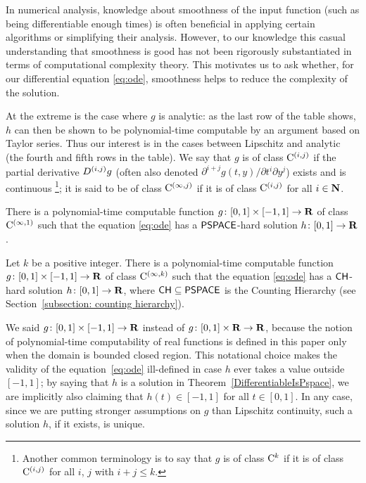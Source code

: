 In numerical analysis, 
knowledge about smoothness of the input function 
(such as being differentiable enough times) 
is often beneficial 
in applying certain algorithms or simplifying their analysis.
However, to our knowledge
this casual understanding that smoothness is good 
has not been 
rigorously substantiated in terms of 
computational complexity theory. 
This motivates us to ask whether, 
for our differential equation \eqref{eq:ode}, 
smoothness helps to reduce the complexity of the solution. 

At the extreme is the case where $g$ is analytic: 
as the last row of the table shows, 
$h$ can then be shown to be polynomial-time computable 
by an argument based on Taylor series. 
Thus our interest is in 
the cases between Lipschitz and analytic 
(the fourth and fifth rows in the table). 
We say that $g$ is of class $\mathrm C ^{(i, j)}$
if the partial derivative $D ^{(i, j)} g$ 
(often also denoted $\partial ^{i + j} g (t, y) / \partial t ^i \partial y ^j$)
exists and is continuous%
\footnote{%
Another common terminology is to say that $g$ is of class $\mathrm C ^k$
if it is of class $\mathrm C ^{(i,j)}$ 
for all $i$, $j$ with $i + j \leq k$.}; 
it is said to be of class $\mathrm C ^{(\infty, j)}$ if
it is of class $\mathrm C ^{(i, j)}$ for all $i \in \mathbf N$. 

\begin{theorem}
 \label{DifferentiableIsPspace}
There is a polynomial-time computable function
$g \colon [0,1] \times [-1,1] \to \mathbf R$ 
of class $\mathrm C ^{(\infty, 1)}$ such that
the equation \eqref{eq:ode} has a 
$\mathsf{PSPACE}$-hard solution $h \colon [0, 1] \to \mathbf R$. 
 \end{theorem}

 \begin{theorem}
  \label{KTimesIsCH}
Let $k$ be a positive integer. 
There is a polynomial-time computable function
$g \colon [0,1] \times [-1,1] \to \mathbf R$ 
of class $\mathrm C ^{(\infty, k)}$ such that
the equation \eqref{eq:ode} has a 
$\mathsf{CH}$-hard solution $h \colon [0, 1] \to \mathbf R$, 
where $\mathsf{CH} \subseteq \mathsf{PSPACE}$ is the 
Counting Hierarchy (see Section~\ref{subsection: counting hierarchy}). 
 \end{theorem}

We said
$g \colon [0,1] \times [-1, 1] \to \mathbf R$ instead of 
$g \colon [0,1] \times \mathbf R \to \mathbf R$, because
the notion of polynomial-time computability of real functions 
is defined in this paper only when the domain is bounded closed region. 
This notational choice makes
the validity of the equation~\eqref{eq:ode} ill-defined 
in case $h$ ever takes a value outside $[-1, 1]$; 
by saying that $h$ is a solution in Theorem~\ref{DifferentiableIsPspace}, 
we are implicitly also claiming that 
$h (t) \in [-1, 1]$ for all $t \in [0, 1]$. 
In any case, 
since we are putting stronger assumptions on $g$ than Lipschitz continuity, 
such a solution $h$, if it exists, is unique. 

